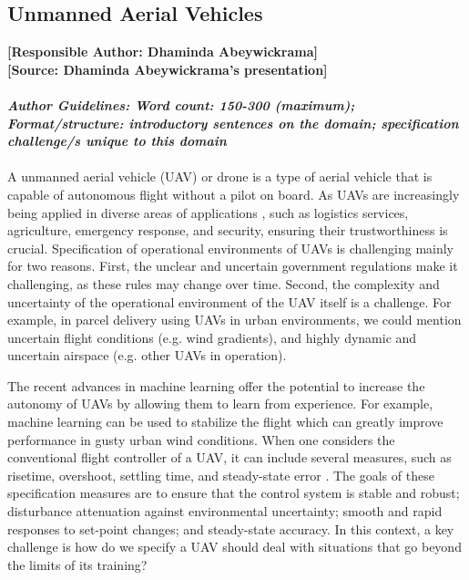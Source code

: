 \documentclass[sigconf]{acmart}
\begin{document}
\subsection{Unmanned Aerial Vehicles}
\textbf{[Responsible Author:  Dhaminda Abeywickrama]}\\
\textbf{[Source: Dhaminda Abeywickrama's presentation]} 
\\\\
\noindent\textbf{\textit{Author Guidelines: Word count: 150-300 (maximum); \\Format/structure: introductory sentences on the domain; specification challenge/s unique to this domain}}\\\\

A unmanned aerial vehicle (UAV) or drone is a type of aerial vehicle that is capable of autonomous flight without a  pilot on board.
As UAVs are increasingly being applied in diverse areas of applications \cite{Ukaegbu2021}, such as logistics services, agriculture, emergency response, and security, ensuring their trustworthiness is crucial.  
Specification of operational environments of UAVs is challenging mainly for two reasons. 
First, the unclear and uncertain government regulations make it challenging, as these rules may change over time. 
Second, the complexity and uncertainty of the operational environment of the UAV itself is a challenge. 
For example, in parcel delivery using UAVs in urban environments, we could mention uncertain flight conditions (e.g. wind gradients), and highly dynamic and uncertain airspace (e.g. other UAVs in operation).

The recent advances in machine learning offer the potential to increase the autonomy of UAVs by allowing them to learn from experience. For example, machine learning can be used to stabilize the flight which can greatly improve performance in gusty urban wind conditions. 
When one considers the conventional flight controller of a UAV, it can include several measures, such as risetime, overshoot, settling time, and steady-state error \cite{Kada2011}.
The goals of these specification measures are to ensure that the control system is stable and robust; disturbance attenuation against environmental uncertainty; smooth and rapid responses to set-point changes; and steady-state accuracy. 
In this context, a key challenge is how do we specify a UAV should deal with situations that go beyond the limits of its training?
\end{document}
